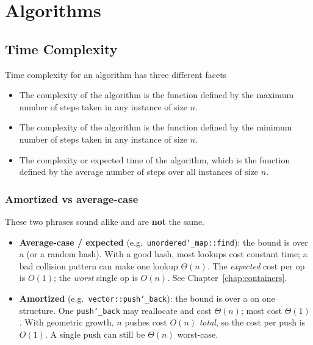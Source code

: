 \chapter{Algorithms}
\label{chap:algorithms}

\section{Time Complexity}
\label{sec:time-complexity}
Time complexity for an algorithm has three different facets
\begin{itemize}
    \item The  complexity of the algorithm is 
          the function defined by the maximum number of steps taken in 
          any instance of size $n$. 
    \item The  complexity of the algorithm is 
          the function defined by the minimum number of steps taken in 
          any instance of size $n$. 
    \item The  complexity or expected time of 
          the algorithm, which is the function defined by the average 
          number of steps over all instances of size $n$. 
\end{itemize}

\subsection{Amortized vs average-case}
\label{subsec:amortized-vs-average}
These two phrases sound alike and are \textbf{not} the same.

\begin{itemize}
    \item \textbf{Average-case / expected} (e.g.\ \texttt{unordered\char`_map::find}):
          the bound is over a  (or a random
          hash). With a good hash, most lookups cost constant time; a bad
          collision pattern can make one lookup $\Theta(n)$. The
          \emph{expected} cost per op is $O(1)$; the \emph{worst} single op
          is $O(n)$. See Chapter~\ref{chap:containers}.
    \item \textbf{Amortized} (e.g.\ \texttt{vector::push\char`_back}):
          the bound is over a  on one
          structure. One \texttt{push\char`_back} may reallocate and cost
          $\Theta(n)$; most cost $\Theta(1)$. With geometric growth, $n$
          pushes cost $O(n)$ \emph{total}, so the 
          cost per push is $O(1)$. A single push can still be $\Theta(n)$
          worst-case.
\end{itemize}

